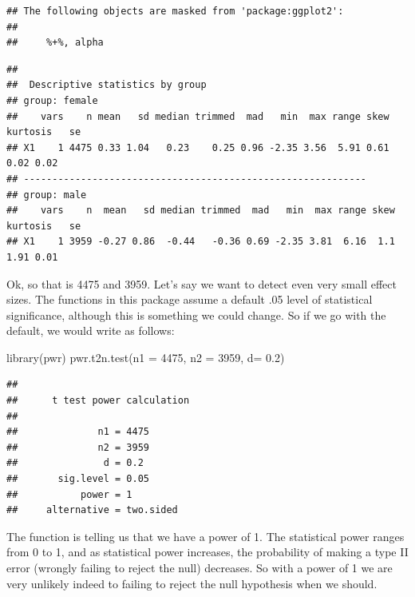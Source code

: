 \documentclass[
]{book}
\newenvironment{Shaded}{\begin{snugshade}}{\end{snugshade}}
\newcommand{\AttributeTok}[1]{\textcolor[rgb]{0.77,0.63,0.00}{#1}}
\newcommand{\DecValTok}[1]{\textcolor[rgb]{0.00,0.00,0.81}{#1}}
\newcommand{\FloatTok}[1]{\textcolor[rgb]{0.00,0.00,0.81}{#1}}
\newcommand{\FunctionTok}[1]{\textcolor[rgb]{0.00,0.00,0.00}{#1}}
\newcommand{\NormalTok}[1]{#1}
\newcommand{\SpecialCharTok}[1]{\textcolor[rgb]{0.00,0.00,0.00}{#1}}
\begin{document}
\begin{verbatim}
## The following objects are masked from 'package:ggplot2':
## 
##     %+%, alpha
\end{verbatim}

\begin{Shaded}
\end{Shaded}

\begin{verbatim}
## 
##  Descriptive statistics by group 
## group: female
##    vars    n mean   sd median trimmed  mad   min  max range skew kurtosis   se
## X1    1 4475 0.33 1.04   0.23    0.25 0.96 -2.35 3.56  5.91 0.61     0.02 0.02
## ------------------------------------------------------------ 
## group: male
##    vars    n  mean   sd median trimmed  mad   min  max range skew kurtosis   se
## X1    1 3959 -0.27 0.86  -0.44   -0.36 0.69 -2.35 3.81  6.16  1.1     1.91 0.01
\end{verbatim}

Ok, so that is 4475 and 3959. Let's say we want to detect even very small effect sizes. The functions in this package assume a default .05 level of statistical significance, although this is something we could change. So if we go with the default, we would write as follows:

\begin{Shaded}
\begin{Highlighting}[]
\FunctionTok{library}\NormalTok{(pwr)}
\FunctionTok{pwr.t2n.test}\NormalTok{(}\AttributeTok{n1 =} \DecValTok{4475}\NormalTok{, }\AttributeTok{n2 =} \DecValTok{3959}\NormalTok{, }\AttributeTok{d=} \FloatTok{0.2}\NormalTok{)}
\end{Highlighting}
\end{Shaded}

\begin{verbatim}
## 
##      t test power calculation 
## 
##              n1 = 4475
##              n2 = 3959
##               d = 0.2
##       sig.level = 0.05
##           power = 1
##     alternative = two.sided
\end{verbatim}

The function is telling us that we have a power of 1. The statistical power ranges from 0 to 1, and as statistical power increases, the probability of making a type II error (wrongly failing to reject the null) decreases. So with a power of 1 we are very unlikely indeed to failing to reject the null hypothesis when we should.
\end{document}
